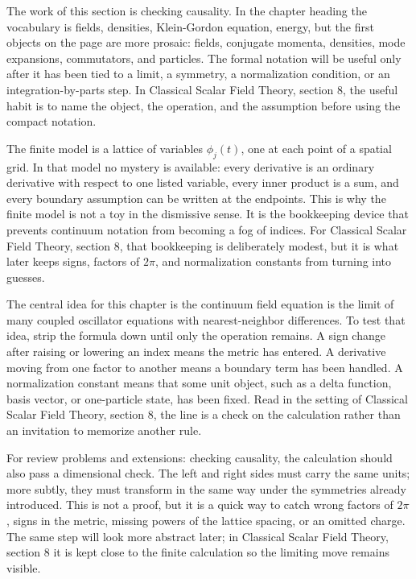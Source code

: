 The work of this section is checking causality.  In the chapter heading the vocabulary is fields, densities, Klein-Gordon equation, energy, but the first objects on the page are more prosaic: fields, conjugate momenta, densities, mode expansions, commutators, and particles.  The formal notation will be useful only after it has been tied to a limit, a symmetry, a normalization condition, or an integration-by-parts step.  In Classical Scalar Field Theory, section 8, the useful habit is to name the object, the operation, and the assumption before using the compact notation.

The finite model is a lattice of variables \(\phi_j(t)\), one at each point of a spatial grid.  In that model no mystery is available: every derivative is an ordinary derivative with respect to one listed variable, every inner product is a sum, and every boundary assumption can be written at the endpoints.  This is why the finite model is not a toy in the dismissive sense.  It is the bookkeeping device that prevents continuum notation from becoming a fog of indices.  For Classical Scalar Field Theory, section 8, that bookkeeping is deliberately modest, but it is what later keeps signs, factors of \(2\pi\), and normalization constants from turning into guesses.

The central idea for this chapter is the continuum field equation is the limit of many coupled oscillator equations with nearest-neighbor differences.  To test that idea, strip the formula down until only the operation remains.  A sign change after raising or lowering an index means the metric has entered.  A derivative moving from one factor to another means a boundary term has been handled.  A normalization constant means that some unit object, such as a delta function, basis vector, or one-particle state, has been fixed.  Read in the setting of Classical Scalar Field Theory, section 8, the line is a check on the calculation rather than an invitation to memorize another rule.

For review problems and extensions: checking causality, the calculation should also pass a dimensional check.  The left and right sides must carry the same units; more subtly, they must transform in the same way under the symmetries already introduced.  This is not a proof, but it is a quick way to catch wrong factors of \(2\pi\), signs in the metric, missing powers of the lattice spacing, or an omitted charge.  The same step will look more abstract later; in Classical Scalar Field Theory, section 8 it is kept close to the finite calculation so the limiting move remains visible.

